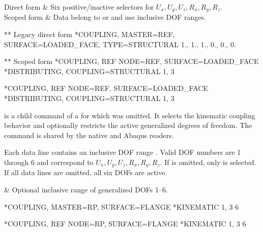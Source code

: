 \begin{keyworddata}
Direct form & Six positive/inactive selectors for \(U_x,U_y,U_z,R_x,R_y,R_z\). \\
Scoped form & Data belong to  or  and use inclusive DOF ranges. \\
\end{keyworddata}

\exampleheading

\begin{dialectexamples}
\begin{femasterdeck}
** Legacy direct form
*COUPLING, MASTER=REF,
 SURFACE=LOADED_FACE, TYPE=STRUCTURAL
1., 1., 1., 0., 0., 0.

** Scoped form
*COUPLING, REF NODE=REF, SURFACE=LOADED_FACE
*DISTRIBUTING, COUPLING=STRUCTURAL
1, 3
\end{femasterdeck}
\begin{abaqusdeck}
*COUPLING, REF NODE=REF, SURFACE=LOADED_FACE
*DISTRIBUTING, COUPLING=STRUCTURAL
1, 3
\end{abaqusdeck}
\end{dialectexamples}


 is a child command of a  for which  was omitted. It selects the kinematic coupling behavior and optionally restricts the active generalized degrees of freedom. The command is shared by the native and Abaqus readers.

Each data line contains an inclusive DOF range . Valid DOF numbers are 1 through 6 and correspond to \(U_x,U_y,U_z,R_x,R_y,R_z\). If  is omitted, only  is selected. If all data lines are omitted, all six DOFs are active.

\begin{keyworddata}
 & Optional inclusive range of generalized DOFs 1--6. \\
\end{keyworddata}

\exampleheading
\begin{dialectexamples}
\begin{femasterdeck}
*COUPLING, MASTER=RP, SURFACE=FLANGE
*KINEMATIC
1, 3
6
\end{femasterdeck}
\begin{abaqusdeck}
*COUPLING, REF NODE=RP, SURFACE=FLANGE
*KINEMATIC
1, 3
6
\end{abaqusdeck}
\end{dialectexamples}

